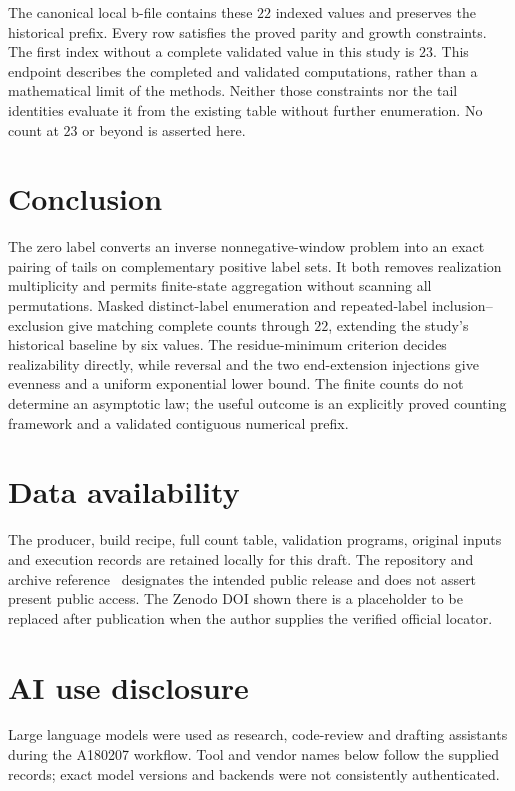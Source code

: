 \documentclass[11pt]{article}
\theoremstyle{definition}
\theoremstyle{remark}
\begin{document}
The canonical local b-file contains these $22$ indexed values and preserves
the historical prefix. Every row satisfies the proved parity and growth
constraints. The first index without a complete validated value in this
study is $23$. This endpoint describes the completed and validated
computations, rather than a mathematical limit of the methods. Neither
those constraints nor the tail identities evaluate
it from the existing table without further enumeration. No count at $23$
or beyond is asserted here.

\section{Conclusion}

The zero label converts an inverse nonnegative-window problem into an exact
pairing of tails on complementary positive label sets. It both removes
realization multiplicity and permits finite-state aggregation without scanning
all permutations. Masked distinct-label enumeration and repeated-label
inclusion--exclusion give matching complete counts through $22$, extending
the study's historical baseline by six values. The residue-minimum criterion
decides realizability directly, while reversal and the two end-extension
injections give evenness and a uniform exponential lower bound. The finite counts
do not determine an asymptotic law; the useful outcome is an explicitly
proved counting framework and a validated contiguous numerical prefix.

\section*{Data availability}

The producer, build recipe, full count table, validation programs, original
inputs and execution records are retained locally for this draft. The
repository and archive reference~\cite{corti} designates the intended public
release and does not assert present public access. The Zenodo DOI shown
there is a placeholder to be replaced after publication when the author
supplies the verified official locator.

\section*{AI use disclosure}

Large language models were used as research, code-review and drafting
assistants during the A180207 workflow. Tool and vendor names below follow
the supplied records; exact model versions and backends were not consistently
authenticated.
\end{document}
